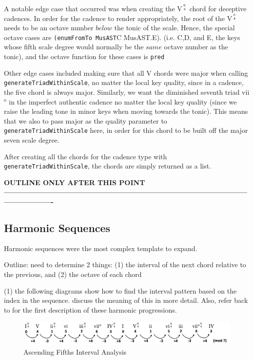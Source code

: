 \documentclass{report}
\begin{document}
A notable edge case that occurred was when creating the V$^{6 \atop 4}$ chord for deceptive cadences. In order for the cadence to render appropriately, the root of the V$^{6 \atop 4}$ needs to be an octave number $below$ the tonic of the scale. Hence, the special octave cases are \verb.(enumFromTo MusAST.C MusAST.E). (i.e. C,D, and E, the keys whose  fifth scale degree would normally be the $same$ octave number as the tonic), and the octave function for these cases is  \verb.pred.

Other edge cases included making sure that all V chords were major when calling \\\verb.generateTriadWithinScale., no matter the local key quality, since in a cadence, the five chord is always major. Similarly, we want the diminished seventh triad vii$^\text{o}$ in the imperfect authentic cadence no matter the local key quality (since we raise the leading tone in minor keys when moving towards the tonic). This means that  we also to pass major as the quality parameter to \verb.generateTriadWithinScale. here, in order for this chord to be built off the major seven scale degree.

After creating all the chords for the cadence  type with  \verb.generateTriadWithinScale., the chords are simply returned as a list.

\textbf{OUTLINE ONLY AFTER THIS POINT----------------------------------------------------------------------------------------------------------------}
\subsection{Harmonic Sequences}
Harmonic sequences were the most complex template to expand.

Outline:
need to determine 2 things: (1) the interval of the next chord relative to the previous, and (2) the octave of each chord

(1) the following diagrams show how to find the interval pattern based on the index in the sequence. discuss the meaning of this in more detail. Also, refer back to  for the first description of these harmonic progressions.

\begin{figure}[h!]
\centering
\includegraphics[width=\textwidth]{images/asc_fifths_intervals}
  \caption{Ascending Fifths Interval Analysis}
\end{figure}
\end{document}
